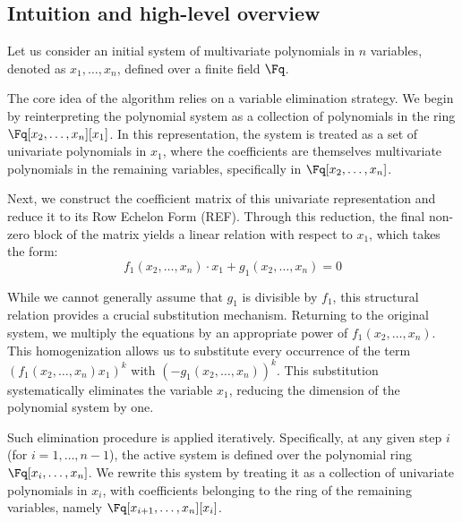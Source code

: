 

\subsection{Intuition and high-level overview}
Let us consider an initial system of multivariate polynomials in $n$ variables, denoted as $x_1, \dots, x_n$, defined over a finite field $\Fq$. 

The core idea of the algorithm relies on a variable elimination strategy. We begin by reinterpreting the polynomial system as a collection of polynomials in the ring $\Fq[x_2, \dots, x_n][x_1]$. In this representation, the system is treated as a set of univariate polynomials in $x_1$, where the coefficients are themselves multivariate polynomials in the remaining variables, specifically in $\Fq[x_2, \dots, x_n]$.

Next, we construct the coefficient matrix of this univariate representation and reduce it to its Row Echelon Form (REF). Through this reduction, the final non-zero block of the matrix yields a linear relation with respect to $x_1$, which takes the form:
\begin{equation*}
    f_1(x_2, \dots, x_n)\cdot x_1 + g_1(x_2, \dots, x_n) = 0
    \label{eq:linear_relation_1}
\end{equation*}

While we cannot generally assume that $g_1$ is divisible by $f_1$, this structural relation provides a crucial substitution mechanism. Returning to the original system, we multiply the equations by an appropriate power of $f_1(x_2, \dots, x_n)$. This homogenization allows us to substitute every occurrence of the term $(f_1(x_2, \dots, x_n)x_1)^k$ with $(-g_1(x_2, \dots, x_n))^k$. This substitution systematically eliminates the variable $x_1$, reducing the dimension of the polynomial system by one.

Such elimination procedure is applied iteratively. Specifically, at any given step $i$ (for $i = 1, \dots, n-1$), the active system is defined over the polynomial ring $\Fq[x_i, \dots, x_n]$. We rewrite this system by treating it as a collection of univariate polynomials in $x_i$, with coefficients belonging to the ring of the remaining variables, namely $\Fq[x_{i+1}, \dots, x_n][x_i]$. 

